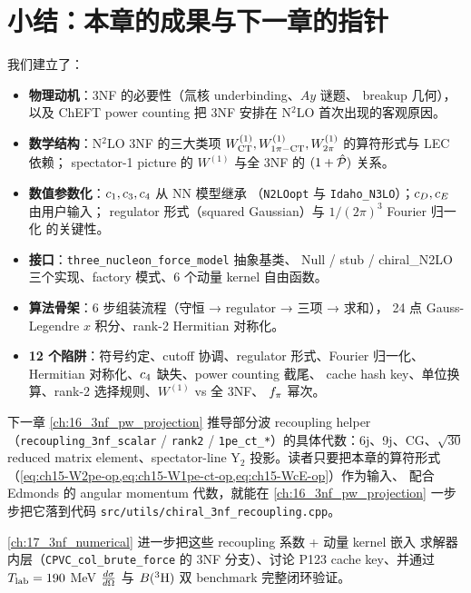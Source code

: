 \section{小结：本章的成果与下一章的指针}
\label{sec:ch15-summary}

我们建立了：
\begin{itemize}
\item \textbf{物理动机}：3NF 的必要性（氚核 underbinding、\(Ay\) 谜题、
      breakup 几何），以及 ChEFT power counting 把 3NF 安排在 N\(^2\)LO
      首次出现的客观原因。
\item \textbf{数学结构}：N\(^2\)LO 3NF 的三大类项 \(W^{(1)}_{\rm CT},
      W^{(1)}_{1\pi-{\rm CT}}, W^{(1)}_{2\pi}\) 的算符形式与 LEC 依赖；
      spectator-1 picture 的 \(W^{(1)}\) 与全 3NF 的 \((1+\hat{\mathcal{P}})\) 关系。
\item \textbf{数值参数化}：\(c_1, c_3, c_4\) 从 NN 模型继承
      （\texttt{N2LOopt} 与 \texttt{Idaho\_N3LO}）；\(c_D, c_E\) 由用户输入；
      regulator 形式（squared Gaussian）与 \(1/(2\pi)^3\) Fourier 归一化
      的关键性。
\item \textbf{接口}：\texttt{three\_nucleon\_force\_model} 抽象基类、
      Null / stub / chiral\_N2LO 三个实现、factory 模式、6 个动量 kernel
      自由函数。
\item \textbf{算法骨架}：6 步组装流程（守恒 → regulator → 三项 → 求和），
      24 点 Gauss-Legendre \(x\) 积分、rank-2 Hermitian 对称化。
\item \textbf{12 个陷阱}：符号约定、cutoff 协调、regulator 形式、Fourier
      归一化、Hermitian 对称化、\(c_4\) 缺失、power counting 截尾、
      cache hash key、单位换算、rank-2 选择规则、\(W^{(1)}\) vs 全 3NF、
      \(f_\pi\) 幂次。
\end{itemize}

下一章 \cref{ch:16_3nf_pw_projection} 推导部分波 recoupling
helper（\texttt{recoupling\_3nf\_scalar} / \texttt{rank2} /
\texttt{1pe\_ct\_*}）的具体代数：6j、9j、CG、\(\sqrt{30}\) reduced matrix
element、spectator-line Y\(_2\) 投影。读者只要把本章的算符形式
（\cref{eq:ch15-W2pe-op,eq:ch15-W1pe-ct-op,eq:ch15-WcE-op}）作为输入、
配合 Edmonds \cite{Edmonds1957} 的 angular momentum 代数，就能在
\cref{ch:16_3nf_pw_projection} 一步步把它落到代码 \texttt{src/utils/chiral\_3nf\_recoupling.cpp}。

\cref{ch:17_3nf_numerical} 进一步把这些 recoupling 系数 + 动量 kernel 嵌入
求解器内层（\texttt{CPVC\_col\_brute\_force} 的 3NF 分支）、讨论 P123 cache
key、并通过 \({T_{\text{lab}}} = 190\) MeV \(\frac{d\sigma}{d\Omega}\) 与 \(B(^3{\rm H})\) 双 benchmark
完整闭环验证。
